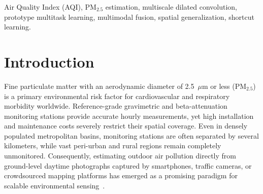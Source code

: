 \documentclass[conference]{IEEEtran}
\newcommand{\pmtwofive}{PM$_{2.5}$}
\begin{document}
\begin{abstract}
  PFRML model on the held-out test set (MAE $= 41.12$ vs.\ $45.04$, paired 95\%
  confidence interval $[-6.27, -1.58]$) and beyond 25~km ($39.60$ vs.\ $46.79$,
  $[-11.92, -2.53]$). Fourth, fusing the prototype-free R1 visual spine with
  metadata under an early-stopped 7-epoch schedule selected via centered moving
  average achieves the lowest overall test MAE ($35.77\;[30.47, 42.72]$,
  $R^2 = 0.6070$), significantly beating both single modalities on the full test
  set ($-4.57\;[-8.31, -1.26]$ vs.\ metadata-only; $-5.35\;[-8.62, -2.26]$
  vs.\ image-only) and tying the plain image model at $> 25$~km ($39.22$
  vs.\ $39.60$), though metadata-zeroed evaluation ($47.56$ test MAE) reveals
  that the fused regression head still relies heavily on geospatial coordinates.
\end{abstract}

\begin{IEEEkeywords}
  Air Quality Index (AQI), \pmtwofive{} estimation, multiscale dilated
  convolution, prototype multitask learning, multimodal fusion, spatial
  generalization, shortcut learning.
\end{IEEEkeywords}

\section{Introduction}
\label{sec:introduction}

Fine particulate matter with an aerodynamic diameter of 2.5~$\mu$m or less
(\pmtwofive) is a primary environmental risk factor for cardiovascular and
respiratory morbidity worldwide. Reference-grade gravimetric and
beta-attenuation monitoring stations provide accurate hourly measurements, yet
high installation and maintenance costs severely restrict their spatial
coverage. Even in densely populated metropolitan basins, monitoring stations are
often separated by several kilometers, while vast peri-urban and rural regions
remain completely unmonitored. Consequently, estimating outdoor air pollution
directly from ground-level daytime photographs captured by smartphones, traffic
cameras, or crowdsourced mapping platforms has emerged as a promising paradigm
for scalable environmental sensing~\cite{marzaguiReviewImageQuality2024,
wangLightweightAirQuality2024, wangPrototypeFeatureRepresentationGuided2026}.
\end{document}
